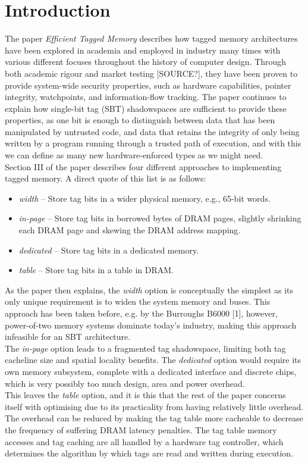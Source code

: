 \documentclass[10pt,a4paper]{article}
\begin{document}
\section*{Introduction}
The paper \textit{Efficient Tagged Memory} describes how tagged memory architectures have been explored in academia and employed in industry many times with various different focuses throughout the history of computer design. Through both academic rigour and market testing [SOURCE?], they have been proven to provide system-wide security properties, such as hardware capabilities, pointer integrity, watchpoints, and information-flow tracking. The paper continues to explain how single-bit tag (SBT) shadowspaces are sufficient to provide these properties, as one bit is enough to distinguish between data that has been manipulated by untrusted code, and data that retains the integrity of only being written by a program running through a trusted path of execution, and with this we can define as many new hardware-enforced types as we might need.\\
Section III of the paper describes four different approaches to implementing tagged memory. A direct quote of this list is as follows:
\begin{itemize}
\item \textit{width} -- Store tag bits in a wider physical memory, e.g., 65-bit words.
\item \textit{in-page} -- Store tag bits in borrowed bytes of DRAM pages, slightly shrinking each DRAM page and skewing the DRAM address mapping.
\item \textit{dedicated} -- Store tag bits in a dedicated memory.
\item \textit{table} -- Store tag bits in a table in DRAM.
\end{itemize}
As the paper then explains, the \textit{width} option is conceptually the simplest as its only unique requirement is to widen the system memory and buses. This approach has been taken before, e.g. by the Burroughs B6000 [1], however, power-of-two memory systems dominate today's industry, making this approach infeasible for an SBT architecture.\\
The \textit{in-page} option leads to a fragmented tag shadowspace, limiting both tag cacheline size and spatial locality benefits. The \textit{dedicated} option would require its own memory subsystem, complete with a dedicated interface and discrete chips, which is very possibly too much design, area and power overhead.\\
This leaves the \textit{table} option, and it is this that the rest of the paper concerns itself with optimising due to its practicality from having relatively little overhead. The overhead can be reduced by making the tag table more cacheable to decrease the frequency of suffering DRAM latency penalties. The tag table memory accesses and tag caching are all handled by a hardware tag controller, which determines the algorithm by which tags are read and written during execution.\\
\end{document}
